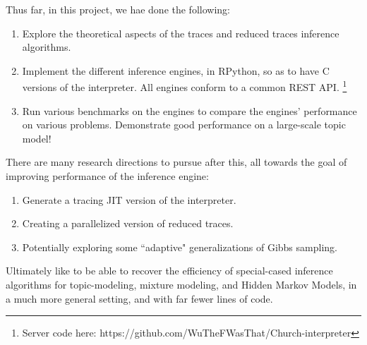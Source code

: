\documentclass[10pt]{article}
\begin{document}
Thus far, in this project, we hae done the following:
\begin{enumerate}
\item Explore the theoretical aspects of the traces and reduced traces inference algorithms.
\item Implement the different inference engines, in RPython, so as to have C versions of the interpreter.  All engines conform to a common REST API.  \footnote{Server code here:  https://github.com/WuTheFWasThat/Church-interpreter}
\item Run various benchmarks on the engines to compare the engines' performance on various problems.  Demonstrate good performance on a large-scale topic model!  %
\end{enumerate}
There are many research directions to pursue after this, all towards the goal of improving performance of the inference engine:
\begin{enumerate}
\item Generate a tracing JIT version of the interpreter.
\item Creating a parallelized version of reduced traces.
\item Potentially exploring some ``adaptive" generalizations of Gibbs sampling.
\end{enumerate}

Ultimately like to be able to recover the efficiency of special-cased inference algorithms for topic-modeling, mixture modeling, and Hidden Markov Models, in a much more general setting, and with far fewer lines of code.







\end{document}

